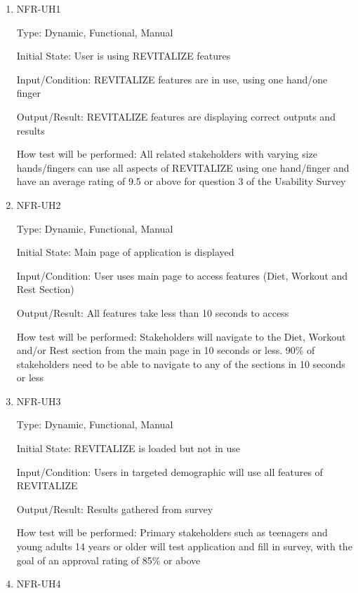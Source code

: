 \documentclass[12pt, titlepage]{article}
\begin{document}
\begin{enumerate}
	
	\item{NFR-UH1\\}
	
	Type: Dynamic, Functional, Manual
	
	Initial State: User is using REVITALIZE features
	
	Input/Condition: REVITALIZE features are in use, using one hand/one finger
	
	Output/Result: REVITALIZE features are displaying correct outputs and results
	
	How test will be performed: All related stakeholders with varying size hands/fingers can use all aspects of REVITALIZE using one hand/finger and have an average rating of 9.5 or above for question 3 of the Usability Survey
	
	\item{NFR-UH2\\}
	
	Type: Dynamic, Functional, Manual
	
	Initial State: Main page of application is displayed
	
	Input/Condition: User uses main page to access features (Diet, Workout and Rest Section)
	
	Output/Result: All features take less than 10 seconds to access
	
	How test will be performed: Stakeholders will navigate to the Diet, Workout and/or Rest section from the main page in 10 seconds or less. 90\% of stakeholders need to be able to navigate to any of the sections in 10 seconds or less
	
	\item{NFR-UH3\\}
	
	Type: Dynamic, Functional, Manual
	
	Initial State: REVITALIZE is loaded but not in use
	
	Input/Condition: Users in targeted demographic will use all features of REVITALIZE
	
	Output/Result: Results gathered from survey
	
	How test will be performed: Primary stakeholders such as teenagers and young adults 14 years or older will test application and fill in survey, with the goal of an approval rating of 85\% or above
	
	\item{NFR-UH4\\}
	

\end{enumerate}
\end{document}
